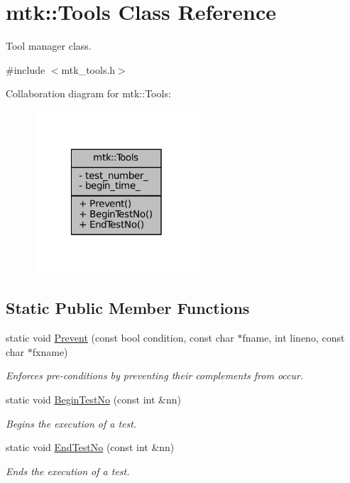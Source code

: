 \hypertarget{classmtk_1_1Tools}{\section{mtk\-:\-:Tools Class Reference}
\label{classmtk_1_1Tools}
}


Tool manager class.  




{\ttfamily \#include $<$mtk\-\_\-tools.\-h$>$}



Collaboration diagram for mtk\-:\-:Tools\-:\nopagebreak
\begin{figure}[H]
\begin{center}
\leavevmode
\includegraphics[width=174pt]{classmtk_1_1Tools__coll__graph}
\end{center}
\end{figure}
\subsection*{Static Public Member Functions}
\begin{DoxyCompactItemize}
\item 
static void \hyperlink{classmtk_1_1Tools_acbcff02946d3db565d53ecbcc459f0b5}{Prevent} (const bool condition, const char $\ast$fname, int lineno, const char $\ast$fxname)
\begin{DoxyCompactList}\small\item\em Enforces pre-\/conditions by preventing their complements from occur. \end{DoxyCompactList}\item 
static void \hyperlink{classmtk_1_1Tools_a35cefa938105619b731ea4fedb86becf}{Begin\-Test\-No} (const int \&nn)
\begin{DoxyCompactList}\small\item\em Begins the execution of a test. \end{DoxyCompactList}\item 
static void \hyperlink{classmtk_1_1Tools_a5d3f78d17228fb36a73567c191f0f4ee}{End\-Test\-No} (const int \&nn)
\begin{DoxyCompactList}\small\item\em Ends the execution of a test. \end{DoxyCompactList}\end{DoxyCompactItemize}
